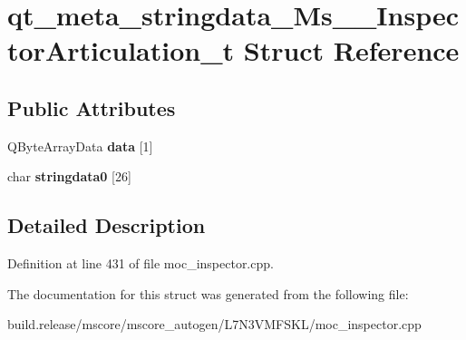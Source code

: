 \hypertarget{structqt__meta__stringdata___ms_____inspector_articulation__t}{}\section{qt\+\_\+meta\+\_\+stringdata\+\_\+\+Ms\+\_\+\+\_\+\+Inspector\+Articulation\+\_\+t Struct Reference}
\label{structqt__meta__stringdata___ms_____inspector_articulation__t}
\subsection*{Public Attributes}
\begin{DoxyCompactItemize}
\item 
\mbox{\label{structqt__meta__stringdata___ms_____inspector_articulation__t_a4944bba2b1fc57c24ce1d7037f514ef6}} 
Q\+Byte\+Array\+Data {\bfseries data} \mbox{[}1\mbox{]}
\item 
\mbox{\label{structqt__meta__stringdata___ms_____inspector_articulation__t_af7194e43f5fe471343c5fac08ce6581d}} 
char {\bfseries stringdata0} \mbox{[}26\mbox{]}
\end{DoxyCompactItemize}


\subsection{Detailed Description}


Definition at line 431 of file moc\+\_\+inspector.\+cpp.



The documentation for this struct was generated from the following file\+:\begin{DoxyCompactItemize}
\item 
build.\+release/mscore/mscore\+\_\+autogen/\+L7\+N3\+V\+M\+F\+S\+K\+L/moc\+\_\+inspector.\+cpp\end{DoxyCompactItemize}
